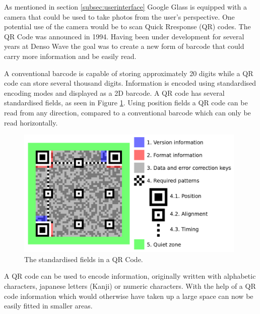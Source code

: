 As mentioned in section \ref{subsec:userinterface} Google Glass is equipped with a camera that could be used to take photos from the user's perspective. One potential use of the camera would be to scan Quick Rresponse (QR) codes. The QR Code was announced in 1994. Having been under development for several years at Denso Wave the goal was to create a new form of barcode that could carry more information and be easily read.\cite{qrCodeHistory}

A conventional barcode is capable of storing approximately 20 digits while a QR code can store several thousand digits.\cite{qrCodeType} Information is encoded using standardised encoding modes and displayed as a 2D barcode. A QR code has several standardised fields, as seen in Figure \ref{qrcodestandard}. Using position fields a QR code can be read from any direction, compared to a conventional barcode which can only be read horizontally.\cite{qrCodeAbout}

	\begin{figure}[ht!]
		\centering
		\includegraphics[width=110mm]{images/qrcodestandard}
		\caption{The standardised fields in a QR Code.\cite{qrCodeWiki}}
		\label{qrcodestandard}
	\end{figure}
	
A QR code can be used to encode information, originally written with alphabetic characters, japanese letters (Kanji) or numeric characters.\cite{qrCodeVersion} With the help of a QR code information which would otherwise have taken up a large space can now be easily fitted in smaller areas.